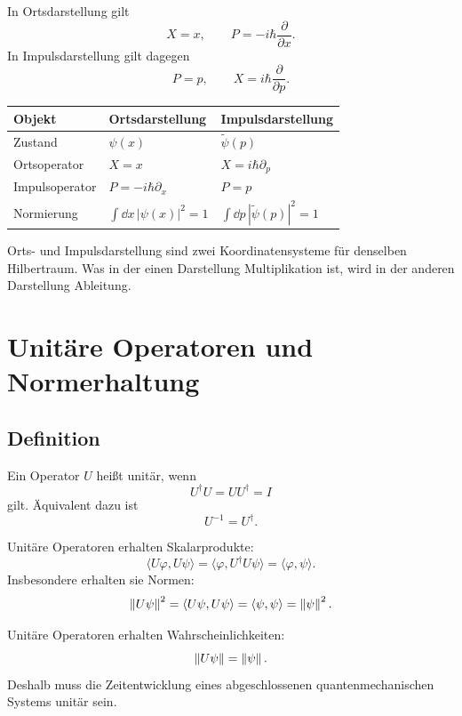 In Ortsdarstellung gilt
\[
    X=x,
    \qquad
    P=-i\hbar\frac{\partial}{\partial x}.
\]
In Impulsdarstellung gilt dagegen
\[
    P=p,
    \qquad
    X=i\hbar\frac{\partial}{\partial p}.
\]

\begin{center}
\begin{tabular}{lll}
\toprule
Objekt & Ortsdarstellung & Impulsdarstellung\\
\midrule
Zustand & $\psi(x)$ & $\tilde\psi(p)$\\
Ortsoperator & $X=x$ & $X=i\hbar\partial_p$\\
Impulsoperator & $P=-i\hbar\partial_x$ & $P=p$\\
Normierung & $\int\dd x\,|\psi(x)|^2=1$ & $\int\dd p\,|\tilde\psi(p)|^2=1$\\
\bottomrule
\end{tabular}
\end{center}

\begin{conceptbox}
Orts- und Impulsdarstellung sind zwei Koordinatensysteme für denselben Hilbertraum. Was in der einen Darstellung Multiplikation ist, wird in der anderen Darstellung Ableitung.
\end{conceptbox}

\section{Unitäre Operatoren und Normerhaltung}

\subsection{Definition}

\begin{definitionbox}
Ein Operator $U$ heißt unitär, wenn
\[
    U^\dagger U=UU^\dagger=I
\]
gilt. Äquivalent dazu ist
\[
    U^{-1}=U^\dagger.
\]
\end{definitionbox}

Unitäre Operatoren erhalten Skalarprodukte:
\[
    \langle U\varphi,U\psi\rangle
    =\langle \varphi,U^\dagger U\psi\rangle
    =\langle\varphi,\psi\rangle.
\]
Insbesondere erhalten sie Normen:
\[
    \left\lVert U\psi \right\rVert^2=\langle U\psi,U\psi\rangle=\langle\psi,\psi\rangle=\left\lVert \psi \right\rVert^2.
\]

\begin{formulabox}
Unitäre Operatoren erhalten Wahrscheinlichkeiten:
\[
    \left\lVert U\psi \right\rVert=\left\lVert \psi \right\rVert.
\]
Deshalb muss die Zeitentwicklung eines abgeschlossenen quantenmechanischen Systems unitär sein.
\end{formulabox}

